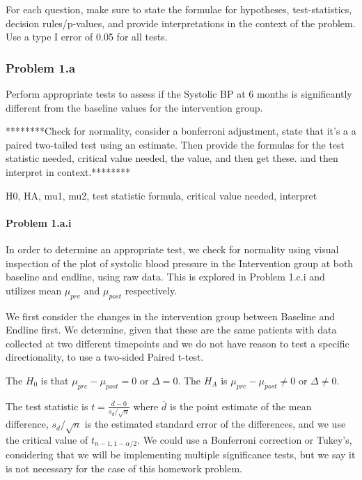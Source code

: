 \documentclass[
]{article}
\begin{document}
For each question, make sure to state the formulae for hypotheses,
test-statistics, decision rules/p-values, and provide interpretations in
the context of the problem. Use a type I error of 0.05 for all tests.

\hypertarget{problem-1.a}{%
\subsubsection{Problem 1.a}\label{problem-1.a}}

Perform appropriate tests to assess if the Systolic BP at 6 months is
significantly different from the baseline values for the intervention
group.

********Check for normality, consider a bonferroni adjustment, state
that it's a a paired two-tailed test using an estimate. Then provide the
formulas for the test statistic needed, critical value needed, the
value, and then get these. and then interpret in context.********

H0, HA, mu1, mu2, test statistic formula, critical value needed,
interpret

\hypertarget{problem-1.a.i}{%
\paragraph{Problem 1.a.i}\label{problem-1.a.i}}

In order to determine an appropriate test, we check for normality using
visual inspection of the plot of systolic blood pressure in the
Intervention group at both baseline and endline, using raw data. This is
explored in Problem 1.c.i and utilizes mean \(\mu_{pre}\) and
\(\mu_{post}\) respectively.

We first consider the changes in the intervention group between Baseline
and Endline first. We determine, given that these are the same patients
with data collected at two different timepoints and we do not have
reason to test a specific directionality, to use a two-sided Paired
t-test.

The \(H_0\) is that \(\mu_{pre} -\mu_{post} = 0\) or \(\Delta = 0\). The
\(H_A\) is \(\mu_{pre} -\mu_{post} \neq 0\) or \(\Delta \neq 0\).

The test statistic is \(t=\frac{\overline d-0}{s_{d} / \sqrt{n}}\) where
\(\overline d\) is the point estimate of the mean difference,
\(s_{d} / \sqrt{n}\) is the estimated standard error of the differences,
and we use the critical value of \(t_{n-1,1-{\alpha/2}}\). We could use
a Bonferroni correction or Tukey's, considering that we will be
implementing multiple significance tests, but we say it is not necessary
for the case of this homework problem.
\end{document}
